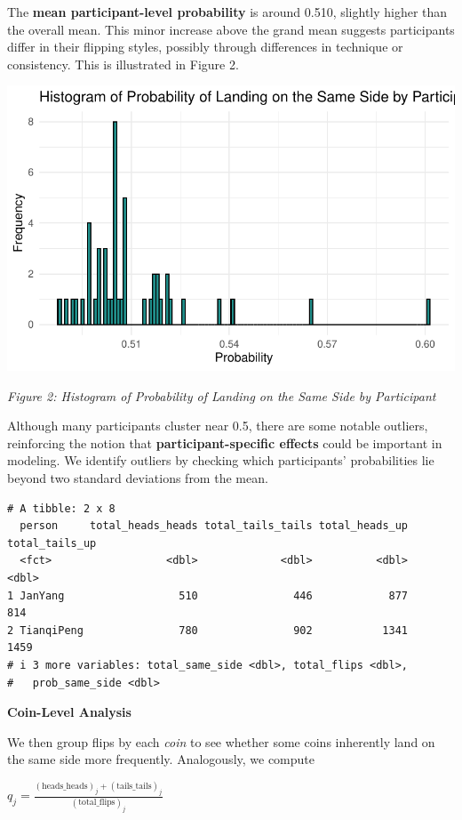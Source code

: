 \documentclass[
  letterpaper,
  DIV=11,
  numbers=noendperiod]{scrartcl}
\begin{document}
The \textbf{mean participant-level probability} is around 0.510,
slightly higher than the overall mean. This minor increase above the
grand mean suggests participants differ in their flipping styles,
possibly through differences in technique or consistency. This is
illustrated in Figure 2.

\includegraphics{Garcia-Vuksic-RMProject-2024_files/figure-pdf/unnamed-chunk-6-1.pdf}

\emph{Figure 2: Histogram of Probability of Landing on the Same Side by
Participant}

Although many participants cluster near 0.5, there are some notable
outliers, reinforcing the notion that \textbf{participant-specific
effects} could be important in modeling. We identify outliers by
checking which participants' probabilities lie beyond two standard
deviations from the mean.

\begin{verbatim}
# A tibble: 2 x 8
  person     total_heads_heads total_tails_tails total_heads_up total_tails_up
  <fct>                  <dbl>             <dbl>          <dbl>          <dbl>
1 JanYang                  510               446            877            814
2 TianqiPeng               780               902           1341           1459
# i 3 more variables: total_same_side <dbl>, total_flips <dbl>,
#   prob_same_side <dbl>
\end{verbatim}

\textbf{Coin-Level Analysis}

We then group flips by each \emph{coin} to see whether some coins
inherently land on the same side more frequently. Analogously, we
compute

\(q_j = \frac{(\text{heads_heads})_j + (\text{tails_tails})_j}{(\text{total_flips})_j}\)
\end{document}
